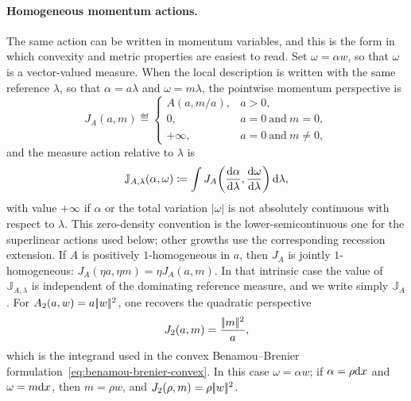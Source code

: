 \paragraph{Homogeneous momentum actions.}\label{rem-generalized-bb}
The same action can be written in momentum variables, and this is the form in which convexity and metric properties are easiest to read. Set $\omega=\alpha w$, so that $\omega$ is a vector-valued measure. When the local description is written with the same reference $\lambda$, so that $\alpha=a\lambda$ and $\omega=m\lambda$, the pointwise momentum perspective is
\begin{equation}\label{eq-general-momentum-perspective}
	J_A(a,m)
	\eqdef
	\begin{cases}
	A(a,m/a), & a>0,\\
	0, & a=0\ \text{and}\ m=0,\\
	+\infty, & a=0\ \text{and}\ m\neq0,
	\end{cases}
\end{equation}
and the measure action relative to $\lambda$ is
\begin{equation}\label{eq-general-measure-momentum-action}
	\mathbb J_{A,\lambda}(\alpha,\omega)
	\coloneqq
	\int
	J_A\!\left(
		\frac{\mathrm{d}\alpha}{\mathrm{d}\lambda},
		\frac{\mathrm{d}\omega}{\mathrm{d}\lambda}
	\right)\mathrm{d}\lambda,
\end{equation}
with value \(+\infty\) if \(\alpha\) or the total variation \(|\omega|\) is not absolutely continuous with respect to \(\lambda\). This zero-density convention is the lower-semicontinuous one for the superlinear actions used below; other growths use the corresponding recession extension. If $A$ is positively $1$-homogeneous in $a$, then $J_A$ is jointly $1$-homogeneous: $J_A(\eta a,\eta m)=\eta J_A(a,m)$. In that intrinsic case the value of \(\mathbb J_{A,\lambda}\) is independent of the dominating reference measure, and we write simply \(\mathbb J_A\). For $A_2(a,w)=a|\!| w |\!|^2$, one recovers the quadratic perspective
\[
	J_2(a,m)=\frac{|\!| m |\!|^2}{a},
\]
which is the integrand used in the convex Benamou--Brenier formulation~\eqref{eq:benamou-brenier-convex}. In this case \(\omega=\alpha w\); if \(\alpha=\rho\mathrm{d} x\) and \(\omega=m\mathrm{d} x\), then \(m=\rho w\), and \(J_2(\rho,m)=\rho|\!| w |\!|^2\).


